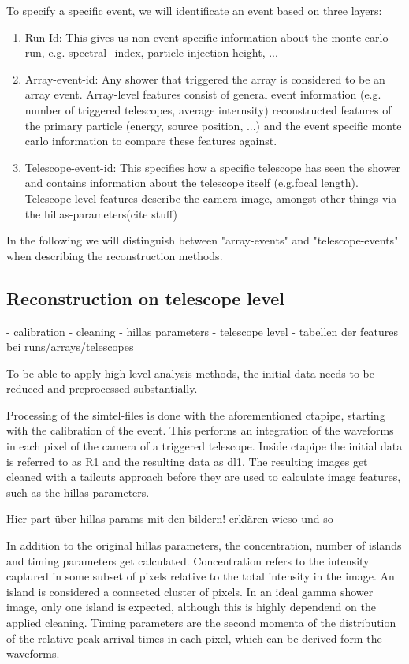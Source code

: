 To specify a specific event, we will identificate an event based on 
three layers:
\begin{enumerate}
    \item{Run-Id: This gives us non-event-specific information about the monte carlo run, e.g.
    spectral\_index, particle injection height, ...}
    \item{Array-event-id: Any shower that triggered the array is considered to be an array event.
    Array-level features consist of general event information 
    (e.g. number of triggered telescopes, average internsity)
    reconstructed features of the primary particle (energy, source position, ...) and the 
    event specific monte carlo information to compare these features against.}
    \item{Telescope-event-id: This specifies how a specific telescope has seen the shower and
    contains information about the telescope itself (e.g.focal length). Telescope-level features 
    describe the camera image, amongst other things via the hillas-parameters(cite stuff)}
\end{enumerate}
In the following we will 
distinguish between "array-events" and "telescope-events" when describing the reconstruction methods.

\subsection{Reconstruction on telescope level}
- calibration
- cleaning
- hillas parameters 
- telescope level
- tabellen der features bei runs/arrays/telescopes

To be able to apply high-level analysis methods, the initial data 
needs to be reduced and preprocessed substantially.


Processing of the simtel-files is done with the aforementioned ctapipe, starting with 
the calibration of the event. This performs an integration of the waveforms in 
each pixel of the camera of a triggered telescope. Inside ctapipe the initial data is referred to as R1
and the resulting data as dl1. The resulting images get cleaned with a tailcuts approach
before they are
used to calculate image features, such as the hillas parameters.

Hier part über hillas params mit den bildern! erklären wieso und so

In addition to the original hillas parameters, the concentration, number of islands 
and timing parameters get calculated.
Concentration refers to the intensity captured in some subset of pixels relative to 
the total intensity in the image.
An island is considered a connected cluster of pixels. In an ideal gamma shower image, only one island
is expected, although this is highly dependend on the applied cleaning.
Timing parameters are the second momenta of the distribution of the relative peak arrival times
in each pixel, which can be derived form the waveforms.

